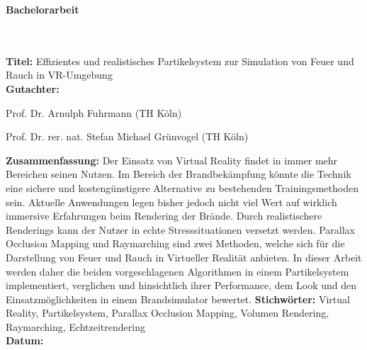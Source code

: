 \addtocounter{page}{1}

\begin{flushleft}
    \begin{huge}
        \textbf{Bachelorarbeit}
    \end{huge}
    ~\\
    ~\\
    \textbf{Titel:}  Effizientes und realistisches Partikelsystem zur Simulation von Feuer und Rauch in VR-Umgebung
    ~\\
    \doublespacing
    \textbf{Gutachter:}
    \begin{description}
        \vspace{-0.2cm}
        \itemsep-8pt
        \item[–]
            Prof. Dr. Arnulph Fuhrmann (TH Köln)
        \item[–]
            Prof. Dr. rer. nat. Stefan Michael Grünvogel (TH Köln)
    \end{description}
    \vspace{-0.4cm}
    \singlespacing
    \textbf{Zusammenfassung:} Der Einsatz von Virtual Reality findet in immer mehr Bereichen 
    seinen Nutzen. Im Bereich der Brandbekämpfung könnte die Technik eine sichere und 
    kostengünstigere Alternative zu bestehenden Trainingsmethoden sein. 
    Aktuelle Anwendungen legen bisher jedoch nicht viel Wert auf wirklich immersive Erfahrungen 
    beim Rendering der Brände. Durch realistischere Renderings kann der Nutzer in echte Stresssituationen
    versetzt werden. Parallax Occlusion Mapping und Raymarching sind zwei Methoden, welche sich für die 
    Darstellung von Feuer und Rauch in Virtueller Realität anbieten.
    In dieser Arbeit werden daher die beiden vorgeschlagenen Algorithmen in einem Partikelsystem implementiert, verglichen und 
    hinsichtlich ihrer Performance, dem Look und den Einsatzmöglichkeiten in einem Brandsimulator bewertet. 
    \singlespacing
    \textbf{Stichwörter:} Virtual Reality, Partikelsystem, Parallax Occlusion Mapping, Volumen Rendering, Raymarching, Echtzeitrendering\\
    \doublespacing
    \textbf{Datum:}


    \vspace{1.3cm}


\end{flushleft}
